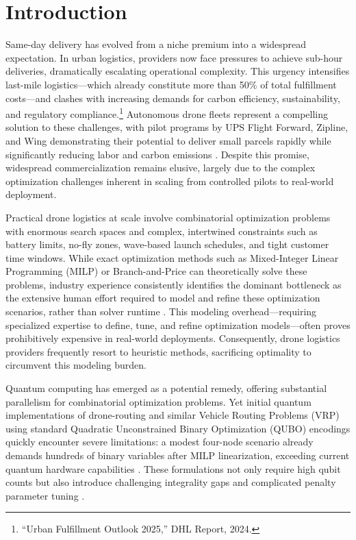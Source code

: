 \section{Introduction}

Same-day delivery has evolved from a niche premium into a widespread expectation.
In urban logistics, providers now face pressures to achieve sub-hour deliveries,
dramatically escalating operational complexity.
This urgency intensifies last-mile logistics—which already constitute more than 50\%
of total fulfillment costs—and clashes with increasing demands for carbon efficiency,
sustainability, and regulatory compliance.\footnote{``Urban Fulfillment Outlook 2025,'' DHL Report, 2024.}
Autonomous drone fleets represent a compelling solution to these challenges,
with pilot programs by UPS Flight Forward, Zipline, and Wing demonstrating their
potential to deliver small parcels rapidly while significantly reducing labor and
carbon emissions \cite{murray2020survey}.
Despite this promise, widespread commercialization remains elusive, largely due to
the complex optimization challenges inherent in scaling from controlled pilots to
real-world deployment.

Practical drone logistics at scale involve combinatorial optimization problems with enormous
search spaces and complex, intertwined constraints such as battery limits, no-fly zones,
wave-based launch schedules, and tight customer time windows.
While exact optimization methods such as Mixed-Integer Linear Programming (MILP) or Branch-and-Price
can theoretically solve these problems, industry experience consistently identifies the dominant bottleneck
as the extensive human effort required to model and refine these optimization scenarios,
rather than solver runtime \cite{hildebrandt_bottleneck_1981,boschetti_matheuristics_2024,kallrath_mixed_2000}.
This modeling overhead—requiring specialized expertise to define, tune, and refine optimization
models—often proves prohibitively expensive in real-world deployments.
Consequently, drone logistics providers frequently resort to heuristic methods,
sacrificing optimality to circumvent this modeling burden.

Quantum computing has emerged as a potential remedy,
offering substantial parallelism for combinatorial optimization problems.
Yet initial quantum implementations of drone-routing and similar Vehicle Routing Problems (VRP)
using standard Quadratic Unconstrained Binary Optimization (QUBO) encodings quickly encounter severe limitations:
a modest four-node scenario already demands hundreds of binary variables after MILP linearization,
exceeding current quantum hardware capabilities \cite{davies_quantum_2024}.
These formulations not only require high qubit counts but also introduce challenging
integrality gaps and complicated penalty parameter tuning \cite{kochenberger2014qubo_review}.

